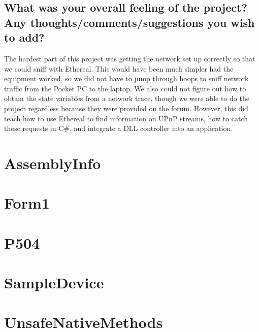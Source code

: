 \documentclass[11pt]{report}
\newcommand{\Section}[1]{\newpage \section{#1}}
\begin{document}
\subsection{What was your overall feeling of the project? Any thoughts/comments/suggestions you wish to add?}

The hardest part of this project was getting the network set up correctly so that we could sniff with Ethereal. This would have been much simpler had the equipment worked, so we did not have to jump through hoops to sniff network traffic from the Pocket PC to the laptop. We also could not figure out how to obtain the state variables from a network trace, though we were able to do the project regardless because they were provided on the forum. However, this did teach how to use Ethereal to find information on UPnP streams, how to catch those requests in C\#, and integrate a DLL controller into an application.

\appendix

\Section{AssemblyInfo}


\Section{Form1}


\Section{P504}


\Section{SampleDevice}


\Section{UnsafeNativeMethods}

\end{document}
